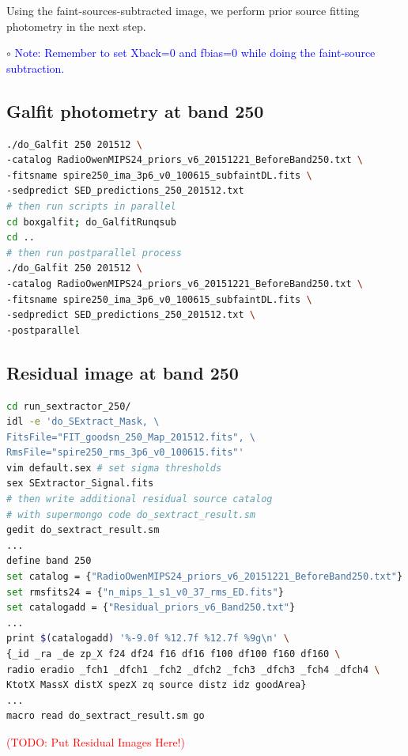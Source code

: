 \documentclass[11pt,a4paper]{article}
\begin{document}
Using the faint-sources-subtracted image, we perform prior source fitting photometry in the next step. 

\indent\hspace{15pt}$\circ$ 
\textcolor{blue}{Note: Remember to set Xback=0 and fbias=0 while doing the faint-source subtraction.}
\\

\subsection{Galfit photometry at band 250}
\label{Band250_Galfit}

\begin{lstlisting}[language=bash]
./do_Galfit 250 201512 \
-catalog RadioOwenMIPS24_priors_v6_20151221_BeforeBand250.txt \
-fitsname spire250_ima_3p6_v0_100615_subfaintDL.fits \
-sedpredict SED_predictions_250_201512.txt
# then run scripts in parallel 
cd boxgalfit; do_GalfitRunqsub
cd ..
# then run postparallel process
./do_Galfit 250 201512 \
-catalog RadioOwenMIPS24_priors_v6_20151221_BeforeBand250.txt \
-fitsname spire250_ima_3p6_v0_100615_subfaintDL.fits \
-sedpredict SED_predictions_250_201512.txt \
-postparallel
\end{lstlisting}

\subsection{Residual image at band 250}
\label{Band250_Galres}

\begin{lstlisting}[language=bash]
cd run_sextractor_250/
idl -e 'do_SExtract_Mask, \
FitsFile="FIT_goodsn_250_Map_201512.fits", \
RmsFile="spire250_rms_3p6_v0_100615.fits"'
vim default.sex # set sigma thresholds
sex SExtractor_Signal.fits
# then write additional residual source catalog
# with supermongo code do_sextract_result.sm
gedit do_sextract_result.sm
...
define band 250
set catalog = {"RadioOwenMIPS24_priors_v6_20151221_BeforeBand250.txt"}
set rmsfits24 = {"n_mips_1_s1_v0_37_rms_ED.fits"}
set catalogadd = {"Residual_priors_v6_Band250.txt"}
...
print $(catalogadd) '%-9.0f %12.7f %12.7f %9g\n' \
{_id _ra _de zp_X f24 df24 f16 df16 f100 df100 f160 df160 \
radio eradio _fch1 _dfch1 _fch2 _dfch2 _fch3 _dfch3 _fch4 _dfch4 \
KtotX MassX distX spezX zq source distz idz goodArea}
...
macro read do_sextract_result.sm go
\end{lstlisting}

\textcolor{red}{(TODO: Put Residual Images Here!)}
\end{document}
